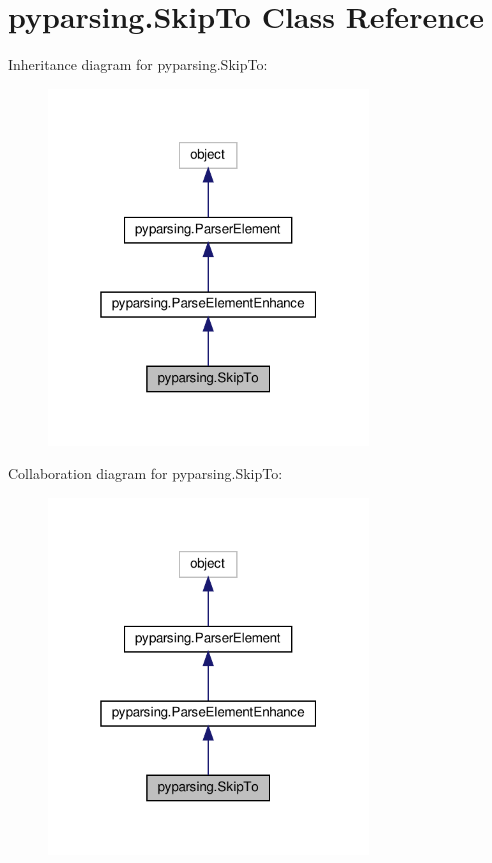 \hypertarget{classpyparsing_1_1SkipTo}{}\section{pyparsing.\+Skip\+To Class Reference}
\label{classpyparsing_1_1SkipTo}


Inheritance diagram for pyparsing.\+Skip\+To\+:
\nopagebreak
\begin{figure}[H]
\begin{center}
\leavevmode
\includegraphics[width=241pt]{classpyparsing_1_1SkipTo__inherit__graph}
\end{center}
\end{figure}


Collaboration diagram for pyparsing.\+Skip\+To\+:
\nopagebreak
\begin{figure}[H]
\begin{center}
\leavevmode
\includegraphics[width=241pt]{classpyparsing_1_1SkipTo__coll__graph}
\end{center}
\end{figure}
